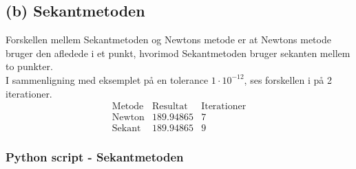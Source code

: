 \subsection*{(b) Sekantmetoden}
%
Forskellen mellem Sekantmetoden og Newtons metode er at Newtons metode bruger den afledede i et punkt, hvorimod Sekantmetoden bruger sekanten mellem to punkter. \\
I sammenligning med eksemplet på en tolerance $1\cdot10^{-12}$, ses forskellen i på 2 iterationer. 
%
$$\begin{array}{l|c|c}
\text{Metode} & \text{Resultat} & \text{Iterationer}\\
\hline
\text{Newton}		& 189.94865 & 7\\
\text{Sekant}		& 189.94865 & 9
\end{array}$$
%
\subsubsection*{Python script - Sekantmetoden}
%
